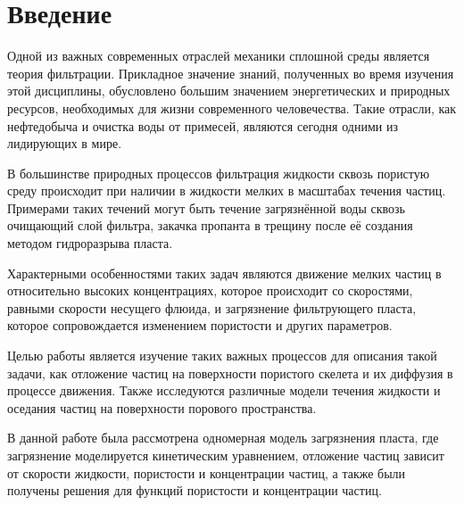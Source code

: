 \section{Введение}

\par Одной из важных современных отраслей механики сплошной среды является теория фильтрации. Прикладное значение знаний, полученных во время изучения этой дисциплины, обусловлено большим значением энергетических и природных ресурсов, необходимых для жизни современного человечества. Такие отрасли, как нефтедобыча и очистка воды от примесей, являются сегодня одними из лидирующих в мире.
\par В большинстве природных процессов фильтрация жидкости сквозь пористую среду происходит при наличии в жидкости мелких в масштабах течения частиц. Примерами таких течений могут быть течение загрязнённой воды сквозь очищающий слой фильтра, закачка пропанта в трещину после её создания методом гидроразрыва пласта.
\par Характерными особенностями таких задач являются движение мелких частиц в относительно высоких концентрациях, которое происходит со скоростями, равными скорости несущего флюида, и загрязнение фильтрующего пласта, которое сопровождается изменением пористости и других параметров.
\par Целью работы является изучение таких важных процессов для описания такой задачи, как отложение частиц на поверхности пористого скелета и их диффузия в процессе движения. Также исследуются различные модели течения жидкости и оседания частиц на поверхности порового пространства.
\par  В данной работе была рассмотрена одномерная модель загрязнения пласта, где загрязнение моделируется кинетическим уравнением, отложение частиц зависит от скорости жидкости, пористости и концентрации частиц, а также были получены решения для функций пористости и концентрации частиц.